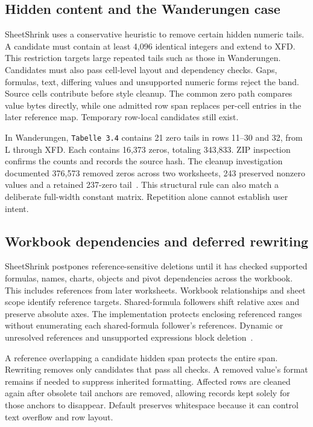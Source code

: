 \subsection{Hidden content and the Wanderungen case}
\label{sec:wanderungen}
SheetShrink uses a conservative heuristic to remove certain hidden numeric tails.
A candidate must contain at least 4,096 identical integers and extend to XFD.
This restriction targets large repeated tails such as those in Wanderungen.
Candidates must also pass cell-level layout and dependency checks.
Gaps, formulas, text, differing values and unsupported numeric forms reject the
band. Source cells contribute before style cleanup. The common zero path compares
value bytes directly, while one admitted row span replaces per-cell entries in
the later reference map. Temporary row-local candidates still exist.

In Wanderungen, \texttt{Tabelle 3.4} contains 21 zero tails in rows 11--30 and 32,
from L through XFD. Each contains 16,373 zeros, totaling 343,833. ZIP inspection
confirms the counts and records the source hash. The cleanup investigation
documented 376,573 removed zeros across two worksheets, 243 preserved nonzero
values and a retained 237-zero tail~\cite{hiddentailcase}. This structural rule can
also match a deliberate full-width constant matrix. Repetition alone cannot
establish user intent.

\subsection{Workbook dependencies and deferred rewriting}
SheetShrink postpones reference-sensitive deletions until it has checked supported
formulas, names, charts, objects and pivot dependencies across the workbook.
This includes references from later worksheets. Workbook relationships and sheet
scope identify reference targets. Shared-formula followers shift relative axes
and preserve absolute axes. The implementation protects enclosing referenced
ranges without enumerating each shared-formula follower's references. Dynamic
or unresolved references and unsupported expressions block deletion~\cite{sheetshrinkcurrentcontract}.

A reference overlapping a candidate hidden span protects the entire span.
Rewriting removes only candidates that pass all checks. A removed value's format
remains if needed to suppress inherited formatting. Affected rows are cleaned
again after obsolete tail anchors are removed, allowing records kept solely for
those anchors to disappear. Default preserves whitespace because it can control
text overflow and row layout.

